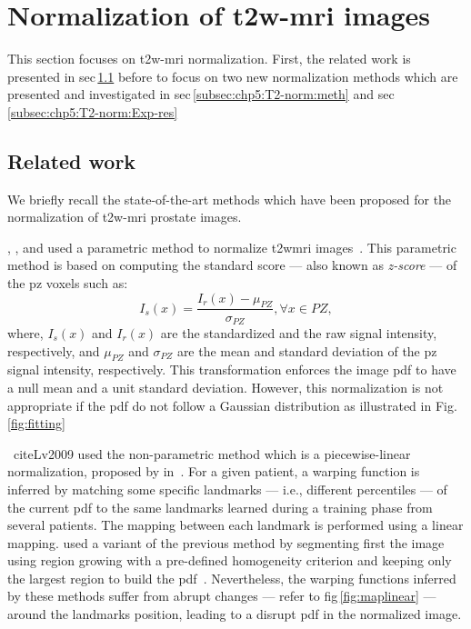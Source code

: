 \section{Normalization of \ac{t2w}-\ac{mri} images} \label{sec:chp5:T2-norm}

This section focuses on \ac{t2w}-\ac{mri} normalization.
First, the related work is presented in \ac{sec}\,\ref{subsec:chp5:relwork1} before to focus on two new normalization methods which are presented and investigated in \acs{sec}\,\ref{subsec:chp5:T2-norm:meth} and \acs{sec}\,\ref{subsec:chp5:T2-norm:Exp-res}

\subsection{Related work}\label{subsec:chp5:relwork1}

We briefly recall the state-of-the-art methods which have been proposed for the normalization of \ac{t2w}-\ac{mri} prostate images.

\citeauthor{Artan2010}, \citeauthor{Ozer2010}, and \citeauthor{rampun2016computerb} used a parametric method to normalize \ac{t2w}\ac{mri} images~\cite{Artan2009,Artan2010,Ozer2009,Ozer2010,rampun2015classifying,rampun2015computer,rampun2016computer,rampun2016computerb}.
This parametric method is based on computing the standard score --- also known as \emph{z-score} --- of the \ac{pz} voxels such as: 
\begin{equation}
  I_{s}(x) = \frac{I_{r}(x) - \mu_{PZ}}{\sigma_{PZ}}, \forall x\in PZ ,
  \label{eq:zscore}
\end{equation}
\noindent where, $I_{s}(x)$ and $I_{r}(x)$ are the standardized and the raw signal intensity, respectively, and $\mu_{PZ}$ and $\sigma_{PZ}$ are the mean and standard deviation of the \ac{pz} signal intensity, respectively. 
This transformation enforces the image \ac{pdf} to have a null mean and a unit standard deviation.
However, this normalization is not appropriate if the \ac{pdf} do not follow a Gaussian distribution as illustrated in Fig.\,\ref{fig:fitting}

\citeauthor{Lv2009}~cite{Lv2009} used the non-parametric method which is a piecewise-linear normalization, proposed by \citeauthor{Nyul2000} in~\cite{Nyul2000}.
For a given patient, a warping function is inferred by matching some specific landmarks --- i.e., different percentiles --- of the current \ac{pdf} to the same landmarks learned during a training phase from several patients. 
The mapping between each landmark is performed using a linear mapping.
\citeauthor{Viswanath2012} used a variant of the previous method by segmenting first the image using region growing with a pre-defined homogeneity criterion and keeping only the largest region to build the \ac{pdf}~\cite{Viswanath2012}.
Nevertheless, the warping functions inferred by these methods suffer from abrupt changes --- refer to \acs{fig}\,\ref{fig:maplinear} --- around the landmarks position, leading to a disrupt \ac{pdf} in the normalized image.

